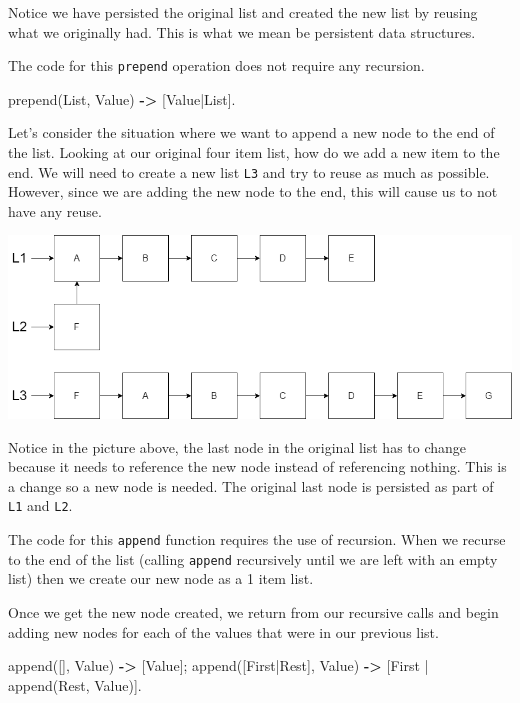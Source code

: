 \documentclass[
]{book}
\newenvironment{Shaded}{\begin{snugshade}}{\end{snugshade}}
\newcommand{\FunctionTok}[1]{\textcolor[rgb]{0.00,0.00,0.00}{#1}}
\newcommand{\OperatorTok}[1]{\textcolor[rgb]{0.81,0.36,0.00}{\textbf{#1}}}
\newcommand{\VariableTok}[1]{\textcolor[rgb]{0.00,0.00,0.00}{#1}}
\begin{document}
Notice we have persisted the original list and created the new list by reusing what we originally had. This is what we mean be persistent data structures.

The code for this \texttt{prepend} operation does not require any recursion.

\begin{Shaded}
\begin{Highlighting}[]
\FunctionTok{prepend(}\VariableTok{List}\FunctionTok{,} \VariableTok{Value}\FunctionTok{)} \OperatorTok{{-}\textgreater{}} \FunctionTok{[}\VariableTok{Value}\FunctionTok{|}\VariableTok{List}\FunctionTok{].}
\end{Highlighting}
\end{Shaded}

Let's consider the situation where we want to append a new node to the end of the list. Looking at our original four item list, how do we add a new item to the end. We will need to create a new list \texttt{L3} and try to reuse as much as possible. However, since we are adding the new node to the end, this will cause us to not have any reuse.

\includegraphics{images/FiveElementListAppend.drawio.png}

Notice in the picture above, the last node in the original list has to change because it needs to reference the new node instead of referencing nothing. This is a change so a new node is needed. The original last node is persisted as part of \texttt{L1} and \texttt{L2}.

The code for this \texttt{append} function requires the use of recursion. When we recurse to the end of the list (calling \texttt{append} recursively until we are left with an empty list) then we create our new node as a 1 item list.

Once we get the new node created, we return from our recursive calls and begin adding new nodes for each of the values that were in our previous list.

\begin{Shaded}
\begin{Highlighting}[]
\FunctionTok{append([],} \VariableTok{Value}\FunctionTok{)} \OperatorTok{{-}\textgreater{}} \FunctionTok{[}\VariableTok{Value}\FunctionTok{];}
\FunctionTok{append([}\VariableTok{First}\FunctionTok{|}\VariableTok{Rest}\FunctionTok{],} \VariableTok{Value}\FunctionTok{)} \OperatorTok{{-}\textgreater{}} \FunctionTok{[}\VariableTok{First} \FunctionTok{|} \FunctionTok{append(}\VariableTok{Rest}\FunctionTok{,} \VariableTok{Value}\FunctionTok{)].}
\end{Highlighting}
\end{Shaded}
\end{document}
